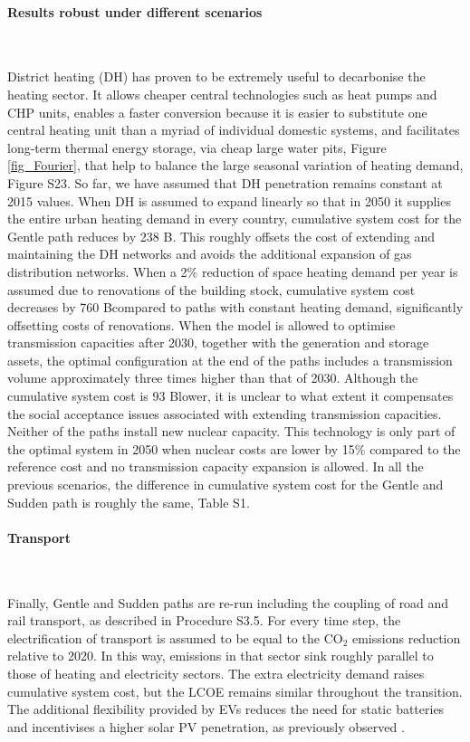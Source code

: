 \documentclass[5p]{elsarticle} %
\begin{document}
 
\paragraph{\textbf{Results robust under different scenarios}} \

District heating (DH) has proven to be extremely useful to decarbonise the heating sector. It allows cheaper central technologies such as heat pumps and CHP units, enables a faster conversion because it is easier to substitute one central heating unit than a myriad of individual domestic systems, and facilitates long-term thermal energy storage, via cheap large water pits, Figure \ref{fig_Fourier}, that help to balance the large seasonal variation of heating demand, Figure S23. So far, we have assumed that DH penetration remains constant at 2015 values. When DH is assumed to expand linearly so that in 2050 it supplies the entire urban heating demand in every country, cumulative system cost for the Gentle path reduces by 238 B\EUR . This roughly offsets the cost of extending and maintaining the DH networks and avoids the additional expansion of gas distribution networks. When a 2\% reduction of space heating demand per year is assumed due to renovations of the building stock, cumulative system cost decreases by 760 B\EUR compared to paths with constant heating demand, significantly offsetting costs of renovations. When the model is allowed to optimise transmission capacities after 2030, together with the generation and storage assets, the optimal configuration at the end of the paths includes a transmission volume approximately three times higher than that of 2030. Although the cumulative system cost is 93 B\EUR lower, it is unclear to what extent it compensates the social acceptance issues associated with extending transmission capacities. Neither of the paths install new nuclear capacity. This technology is only part of the optimal system in 2050 when nuclear costs are lower by 15\% compared to the reference cost and no transmission capacity expansion is allowed. In all the previous scenarios, the difference in cumulative system cost for the Gentle and Sudden path is roughly the same, Table S1.

\paragraph{\textbf{Transport}} \

Finally, Gentle and Sudden paths are re-run including the coupling of road and rail transport, as described in Procedure S3.5. For every time step, the electrification of transport is assumed to be equal to the CO$_2$ emissions reduction relative to 2020. In this way, emissions in that sector sink roughly parallel to those of heating and electricity sectors. The extra electricity demand raises cumulative system cost, but the LCOE remains similar throughout the transition. The additional flexibility provided by EVs reduces the need for static batteries and incentivises a higher solar PV penetration, as previously observed \cite{Brown_2018, Victoria_2019_storage}.
\end{document}
